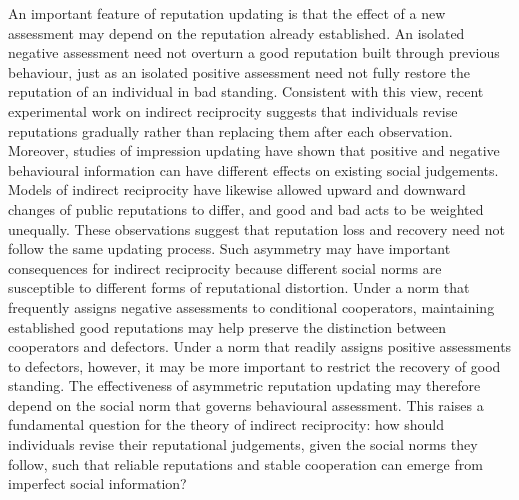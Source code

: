 An important feature of reputation updating is that the effect of a new assessment may depend on the reputation already established\cite{mendesiedlecki2013neural,pandula2024}. An isolated negative assessment need not overturn a good reputation built through previous behaviour, just as an isolated positive assessment need not fully restore the reputation of an individual in bad standing. Consistent with this view, recent experimental work on indirect reciprocity suggests that individuals revise reputations gradually rather than replacing them after each observation\cite{yamamoto2025}. Moreover, studies of impression updating have shown that positive and negative behavioural information can have different effects on existing social judgements\cite{reeder1979,skowronski1989,mendesiedlecki2013diagnostic,siegel2018}. Models of indirect reciprocity have likewise allowed upward and downward changes of public reputations to differ\cite{tanabe2013}, and good and bad acts to be weighted unequally\cite{rankin2009}. These observations suggest that reputation loss and recovery need not follow the same updating process. Such asymmetry may have important consequences for indirect reciprocity because different social norms are susceptible to different forms of reputational distortion. Under a norm that frequently assigns negative assessments to conditional cooperators\cite{okada2020dilemmas}, maintaining established good reputations may help preserve the distinction between cooperators and defectors. Under a norm that readily assigns positive assessments to defectors\cite{schmid2021}, however, it may be more important to restrict the recovery of good standing. The effectiveness of asymmetric reputation updating may therefore depend on the social norm that governs behavioural assessment. This raises a fundamental question for the theory of indirect reciprocity: how should individuals revise their reputational judgements, given the social norms they follow, such that reliable reputations and stable cooperation can emerge from imperfect social information?

